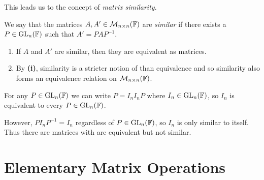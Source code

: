 \documentclass[../main.tex]{subfiles}
\begin{document}
This leads us to the concept of \textit{matrix similarity}.
\begin{definition}
  We say that the matrices $A, A' \in \mathcal{M}_{n \times n}(\mathbb{F})$ are \textit{similar} if there exists a $P \in \mathrm{GL}_n(\mathbb{F})$ such that $A' = PAP^{-1}$.
\end{definition}
\begin{remark}[Remarks]
  \begin{enumerate}
    \item If $A$ and $A'$ are similar, then they are equivalent as matrices.
    \item By \textbf{(i)}, similarity is a stricter notion of than equivalence and so similarity also forms an equivalence relation on $\mathcal{M}_{n \times n}(\mathbb{F})$.
  \end{enumerate}
\end{remark}
\begin{example}
  For any $P \in \mathrm{GL}_n(\mathbb{F})$ we can write $P = I_n I_n P$ where $I_n \in \mathrm{GL}_n(\mathbb{F})$, so $I_n$ is equivalent to every $P \in \mathrm{GL}_n(\mathbb{F})$.

  However, $PI_nP^{-1} = I_n$ regardless of $P \in \mathrm{GL}_n(\mathbb{F})$, so $I_n$ is only similar to itself.
  Thus there are matrices with are equivalent but not similar.
\end{example}
\section{Elementary Matrix Operations}
\end{document}
